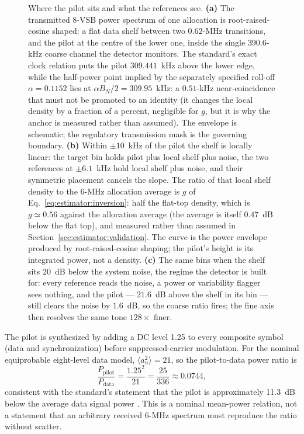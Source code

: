 \begin{figure}[p]
\centering
\resizebox{!}{0.60\textheight}{}
\caption[Where the pilot sits, and what the references see]{Where the pilot sits and what the references see. \textbf{(a)} The transmitted 8-VSB power spectrum of one allocation is root-raised-cosine shaped: a flat data shelf between two $0.62$-MHz transitions, and the pilot at the centre of the lower one, inside the single $390.6$-kHz coarse channel the detector monitors. The standard's exact clock relation puts the pilot $309.441$~kHz above the lower edge, while the half-power point implied by the separately specified roll-off $\alpha = 0.1152$ lies at $\alpha B_N/2 = 309.95$~kHz: a $0.51$-kHz near-coincidence that must not be promoted to an identity (it changes the local density by a fraction of a percent, negligible for $g$, but it is why the anchor is measured rather than assumed). The envelope is schematic; the regulatory transmission mask is the governing boundary. \textbf{(b)} Within $\pm 10$~kHz of the pilot the shelf is locally linear: the target bin holds pilot plus local shelf plus noise, the two references at $\pm 6.1$~kHz hold local shelf plus noise, and their symmetric placement cancels the slope. The ratio of that local shelf density to the $6$-MHz allocation average is $g$ of Eq.~\eqref{eq:estimator:inversion}: half the flat-top density, which is $g \simeq 0.56$ against the allocation average (the average is itself $0.47$~dB below the flat top), and measured rather than assumed in Section~\ref{sec:estimator:validation}. The curve is the power envelope produced by root-raised-cosine shaping; the pilot's height is its integrated power, not a density. \textbf{(c)} The same bins when the shelf sits $20$~dB below the system noise, the regime the detector is built for: every reference reads the noise, a power or variability flagger sees nothing, and the pilot --- $21.6$~dB above the shelf in its bin --- still clears the noise by $1.6$~dB, so the coarse ratio fires; the fine axis then resolves the same tone $128\times$ finer.}
\label{fig:dtv:skirt}
\end{figure}

The pilot is synthesized by adding a DC level 1.25 to every composite symbol
(data and synchronization) before suppressed-carrier modulation.  For the
nominal equiprobable eight-level data model,
$\langle a_n^2\rangle=21$, so the pilot-to-data power ratio is
\begin{equation}
\frac{P_{\mathrm{pilot}}}{P_{\mathrm{data}}}
 = \frac{1.25^2}{21}
 = \frac{25}{336}
 \approx 0.0744,
\end{equation}
consistent with the standard's statement that the pilot is approximately
11.3~dB below the average data signal power \cite{atsc-a53}.  This is a nominal
mean-power relation, not a statement that an arbitrary received 6-MHz spectrum
must reproduce the ratio without scatter.

